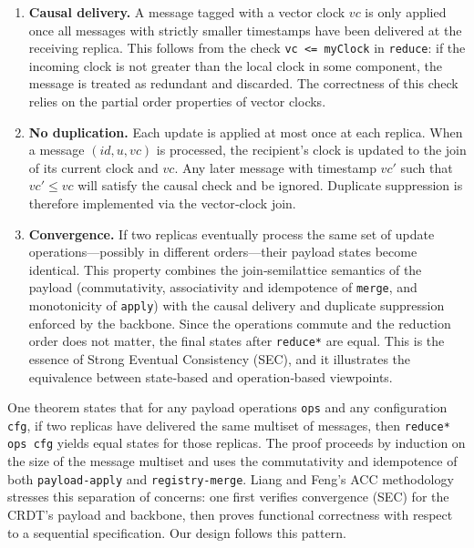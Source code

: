 \begin{enumerate}
  \item \textbf{Causal delivery.}  A message tagged with a vector clock \(vc\) is only applied once all messages with strictly smaller timestamps have been delivered at the receiving replica.  This follows from the check \lstinline{vc <= myClock} in \lstinline{reduce}: if the incoming clock is not greater than the local clock in some component, the message is treated as redundant and discarded.  The correctness of this check relies on the partial order properties of vector clocks\cite{lamport1978time,fidge1988timestamps,mattern1989virtual}.

  \item \textbf{No duplication.}  Each update is applied at most once at each replica.  When a message \((id,u,vc)\) is processed, the recipient’s clock is updated to the join of its current clock and \(vc\).  Any later message with timestamp \(vc'\) such that \(vc'\leq vc\) will satisfy the causal check and be ignored.  Duplicate suppression is therefore implemented via the vector‑clock join\cite{lamport1978time,fidge1988timestamps,mattern1989virtual}.

  \item \textbf{Convergence.}  If two replicas eventually process the same set of update operations—possibly in different orders—their payload states become identical.  This property combines the join‑semilattice semantics of the payload (commutativity, associativity and idempotence of \lstinline{merge}, and monotonicity of \lstinline{apply}) with the causal delivery and duplicate suppression enforced by the backbone.  Since the operations commute and the reduction order does not matter, the final states after \lstinline{reduce*} are equal.  This is the essence of Strong Eventual Consistency (SEC)\cite{shapiro2011conflict}, and it illustrates the equivalence between state‑based and operation‑based viewpoints\cite{shapiro2011conflict}.
\end{enumerate}

One theorem states that for any payload operations \lstinline{ops} and any configuration \lstinline{cfg}, if two replicas have delivered the same multiset of messages, then \lstinline{reduce* ops cfg} yields equal states for those replicas.  The proof proceeds by induction on the size of the message multiset and uses the commutativity and idempotence of both \lstinline{payload-apply} and \lstinline{registry-merge}.  Liang and Feng’s ACC methodology stresses this separation of concerns: one first verifies convergence (SEC) for the CRDT’s payload and backbone, then proves functional correctness with respect to a sequential specification\cite{liang2021abstraction}.  Our design follows this pattern.

